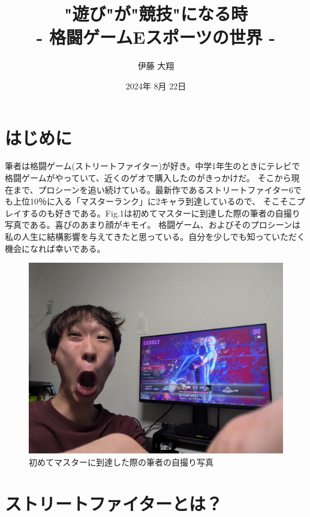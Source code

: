 \documentclass[twocolumn, a4paper]{Zemiresume}
\title{"遊び"が"競技"になる時 \\ - 格闘ゲームEスポーツの世界 -}
\date{2024年 8月 22日}
\author{伊藤 大翔}
\begin{document}
\maketitle

\section{はじめに}
筆者は格闘ゲーム(ストリートファイター)が好き。中学1年生のときにテレビで格闘ゲームがやっていて、近くのゲオで購入したのがきっかけだ。
そこから現在まで、プロシーンを追い続けている。最新作であるストリートファイター6でも上位10％に入る「マスターランク」に2キャラ到達しているので、
そこそこプレイするのも好きである。Fig.1は初めてマスターに到達した際の筆者の自撮り写真である。喜びのあまり顔がキモイ。
格闘ゲーム、およびそのプロシーンは私の人生に結構影響を与えてきたと思っている。自分を少しでも知っていただく機会になれば幸いである。
\begin{figure}[t]
  \centering
  \includegraphics[width=\columnwidth]{img/SF6_Master.jpg}
  \caption{初めてマスターに到達した際の筆者の自撮り写真}\label{fig:sf6_master}
\end{figure}


\section{ストリートファイターとは？}
\end{document}
